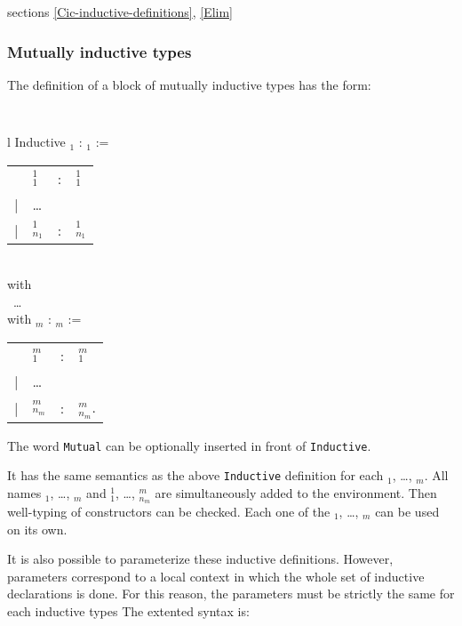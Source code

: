 \SeeAlso sections \ref{Cic-inductive-definitions}, \ref{Elim}

\subsubsection{Mutually inductive types}
\label{Mutual-Inductive}

The definition of a block of mutually inductive types has the form:

\medskip
{\tt 
\begin{tabular}{l}
Inductive {\ident$_1$} : {\type$_1$} :=  \\
\begin{tabular}{clcl}
   & {\ident$_1^1$}     &:& {\type$_1^1$} \\
 | & {\ldots} && \\
 | & {\ident$_{n_1}^1$} &:& {\type$_{n_1}^1$}
\end{tabular}  \\
with\\
~{\ldots} \\
with {\ident$_m$} : {\type$_m$} := \\
\begin{tabular}{clcl}
   & {\ident$_1^m$}     &:& {\type$_1^m$} \\
 | & {\ldots} \\
 | & {\ident$_{n_m}^m$} &:& {\type$_{n_m}^m$}.
\end{tabular}
\end{tabular}
}
\medskip

 The word {\tt Mutual} can be optionally
inserted in front of {\tt Inductive}.

It has the same semantics as the above {\tt Inductive} definition for
each \ident$_1$, {\ldots}, \ident$_m$. All names \ident$_1$, {\ldots},
\ident$_m$ and \ident$_1^1$, \dots, \ident$_{n_m}^m$ are
simultaneously added to the environment. Then
well-typing of constructors can be checked. Each one of the
\ident$_1$, {\ldots}, \ident$_m$ can be used on its own.

It is also possible to parameterize these inductive definitions.
However, parameters correspond to a local
context in which the whole set of inductive declarations is done.  For
this reason, the parameters must be strictly the same for each
inductive types The extented syntax is:

